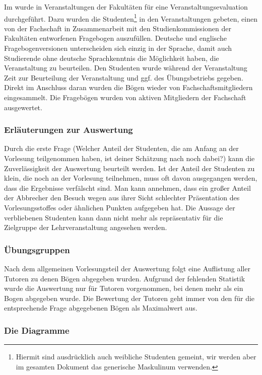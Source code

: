 Im \semesterlong{} wurde in Veranstaltungen der Fakultäten für
\facultylong{} eine Veranstaltungsevaluation durchgeführt.
Dazu wurden die Studenten\footnote{Hiermit sind ausdrücklich auch weibliche
Studenten gemeint, wir werden aber im gesamten Dokument das generische
Maskulinum verwenden.} in den Veranstaltungen gebeten, einen von der
Fachschaft in Zusammenarbeit mit den Studienkommissionen der Fakultäten
entworfenen Fragebogen auszufüllen. 
Deutsche und englische Fragebogenversionen unterscheiden sich einzig in der Sprache, damit auch Studierende ohne deutsche Sprachkenntnis die Möglichkeit haben, die 
Veranstaltung zu beurteilen.
Den Studenten wurde während der Veranstaltung Zeit zur Beurteilung der
Veranstaltung und ggf. des Übungsbetriebs gegeben. Direkt im Anschluss daran wurden die Bögen wieder
von Fachschaftsmitgliedern eingesammelt. Die Fragebögen wurden von
aktiven Mitgliedern der Fachschaft ausgewertet.


\subsubsection{Erläuterungen zur Auswertung}
Durch die erste Frage (\glqq Welcher Anteil der Studenten, die am Anfang an
der Vorlesung teilgenommen haben, ist deiner
Schätzung nach noch dabei?\grqq{}) kann die 
Zuverlässigkeit der Auswertung beurteilt werden. Ist der Anteil der
Studenten zu klein, die noch an 
der Vorlesung teilnehmen, muss oft davon ausgegangen werden, dass
die Ergebnisse verfälscht sind. Man kann annehmen, dass ein großer Anteil 
der Abbrecher den Besuch wegen aus ihrer Sicht schlechter Präsentation
des Vorlesungsstoffes oder ähnlichen Punkten aufgegeben hat. Die Aussage der 
verbliebenen Studenten kann dann nicht mehr als repräsentativ für die 
Zielgruppe der Lehrveranstaltung angesehen werden. 

\subsubsection{Übungsgruppen}
Nach dem allgemeinen Vorlesungsteil der Auswertung folgt eine Auflistung aller Tutoren zu denen Bögen abgegeben wurden. Aufgrund der fehlenden Statistik wurde die Auswertung nur für Tutoren vorgenommen, bei denen mehr als ein Bogen abgegeben wurde. Die Bewertung der Tutoren geht immer von den für die entsprechende Frage abgegebenen Bögen als Maximalwert aus.

\subsubsection{Die Diagramme}

